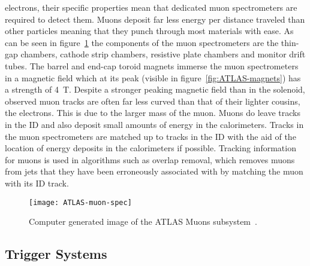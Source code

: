 electrons, their specific properties mean that dedicated muon spectrometers are
required to detect them. Muons deposit far less energy per distance traveled
than other particles meaning that they punch through most materials with ease.
As can be seen in figure~\ref{fig:ATLAS-muon} the components of the muon
spectrometers are the thin-gap chambers, cathode strip chambers, resistive plate
chambers and monitor drift tubes. The barrel and end-cap toroid magnets immerse
the muon spectrometers in a magnetic field which at its peak (visible in
figure~\ref{fig:ATLAS-magnets}) has a strength of 4~T. Despite a stronger
peaking magnetic field than in the solenoid, observed muon tracks are often far
less curved than that of their lighter cousins, the electrons. This is due to the
larger mass of the muon. Muons do leave tracks in the ID and also deposit
small amounts of energy in the calorimeters. Tracks in the muon spectrometers are
matched up to tracks in the ID with the aid of the location of energy deposits
in the calorimeters if possible. Tracking information for muons is used in
algorithms such as overlap removal, which removes muons from jets that they have
been erroneously associated with by matching the muon with its ID track.
\begin{figure}[ht]
  \centering
  \texttt{[image: ATLAS-muon-spec]}
  \caption[ATLAS muon subsystem]{Computer generated image of the ATLAS Muons
    subsystem~\cite{ATLAS-muon-fig}.}%
  \label{fig:ATLAS-muon}
\end{figure}

\subsection{Trigger Systems}%
\label{sec:trigger}

